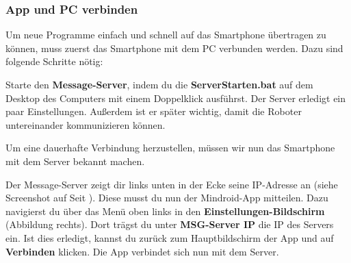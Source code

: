 \documentclass[
	12pt,
	colorbacktitle,
	accentcolor=tud1c,
	draft,
	twoside,
	german
]{tudexercise}
\begin{document}
	\subsubsection{App und PC verbinden}
	Um neue Programme einfach und schnell auf das Smartphone übertragen zu können, muss zuerst das Smartphone mit dem PC verbunden werden. Dazu sind folgende Schritte nötig:
	\begin{enumerate}
	\begin{minipage}{.47\textwidth}	
	\item Starte den \textbf{Message-Server}, indem du die \textbf{ServerStarten.bat} auf dem Desktop des Computers mit einem Doppelklick ausführst. Der Server erledigt ein paar Einstellungen. Außerdem ist er später wichtig, damit die Roboter untereinander kommunizieren können.	 
	\item Um eine dauerhafte Verbindung herzustellen, müssen wir nun das Smartphone mit dem Server bekannt machen.	
	\item Der Message-Server zeigt dir links unten in der Ecke seine IP-Adresse an (siehe Screenshot auf Seit \pageref{fig:server}). Diese musst du nun der Mindroid-App mitteilen. Dazu navigierst du über das Menü oben links in den \textbf{Einstellungen-Bildschirm} (Abbildung rechts). Dort trägst du unter \textbf{MSG-Server IP} die IP des Servers ein. Ist dies erledigt, kannst du zurück zum Hauptbildschirm der App und auf \textbf{Verbinden} klicken. Die App verbindet sich nun mit dem Server.	
	\end{minipage}	
	\hfill
	\begin{minipage}{.47\textwidth}
	

\end{minipage}
\end{enumerate}
\end{document}
